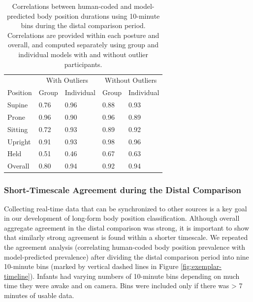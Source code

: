 \documentclass[
  man]{apa6}
\begin{document}
\begin{table}[tbp]

\begin{center}
\begin{threeparttable}

\caption{\label{tab:pt2binstable}Correlations between human-coded and model-predicted body position durations using 10-minute bins during the distal comparison period. Correlations are provided within each posture and overall, and computed separately using group and individual models with and without outlier participants.}

\begin{tabular}{lllll}
\toprule
 & \multicolumn{2}{c}{With Outliers} & \multicolumn{2}{c}{Without Outliers} \\
\cmidrule(r){2-3} \cmidrule(r){4-5}
Position & Group & Individual & Group & Individual\\
\midrule
Supine & 0.76 & 0.96 & 0.88 & 0.93\\
Prone & 0.96 & 0.90 & 0.96 & 0.89\\
Sitting & 0.72 & 0.93 & 0.89 & 0.92\\
Upright & 0.91 & 0.93 & 0.98 & 0.96\\
Held & 0.51 & 0.46 & 0.67 & 0.63\\ \midrule
Overall & 0.80 & 0.94 & 0.92 & 0.94\\
\bottomrule
\end{tabular}

\end{threeparttable}
\end{center}

\end{table}

\hypertarget{short-timescale-agreement-during-the-distal-comparison}{%
\subsubsection{Short-Timescale Agreement during the Distal Comparison}\label{short-timescale-agreement-during-the-distal-comparison}}

Collecting real-time data that can be synchronized to other sources is a key goal in our development of long-form body position classification. Although overall aggregate agreement in the distal comparison was strong, it is important to show that similarly strong agreement is found within a shorter timescale. We repeated the agreement analysis (correlating human-coded body position prevalence with model-predicted prevalence) after dividing the distal comparison period into nine 10-minute bins (marked by vertical dashed lines in Figure \ref{fig:exemplar-timeline}). Infants had varying numbers of 10-minute bins depending on much time they were awake and on camera. Bins were included only if there was \textgreater{} 7 minutes of usable data.
\end{document}
